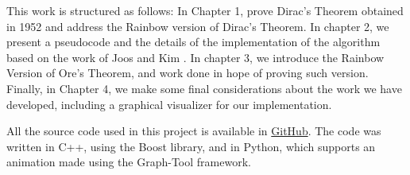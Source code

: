 This work is structured as follows: In Chapter 1, prove Dirac's Theorem obtained in 1952 \cite{dirac1952} and address the Rainbow version of Dirac's Theorem. In chapter 2, we present a pseudocode and the details of the implementation of the algorithm based on the work of Joos and Kim \cite{Joos_2020}. In chapter 3, we introduce the Rainbow Version of Ore's Theorem, and work done in hope of proving such version.
Finally, in Chapter 4, we make some final considerations about the work we have developed, including a graphical visualizer for our implementation.

All the source code used in this project is available in \href{https://github.com/wmrmrx/TCC}{GitHub}. The code was written in C++, using the Boost 
library, and in Python, which supports an animation made using the Graph-Tool framework.




